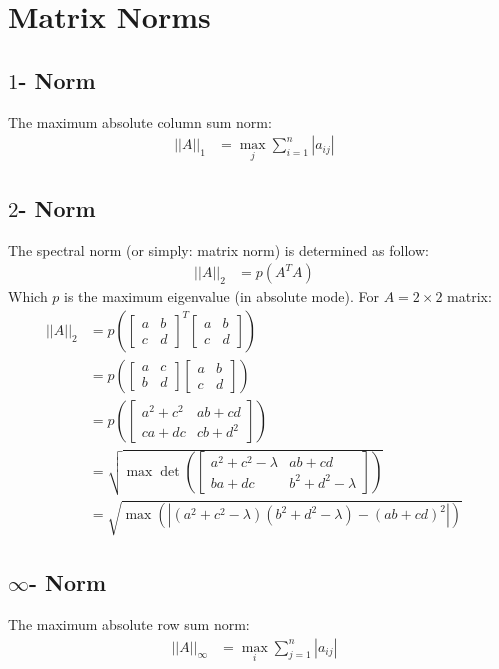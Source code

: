 \section{Matrix Norms}

	\subsection{$1$- Norm}

		The maximum absolute column sum norm:
		\begin{align}
			||A||_{1} &= \max_{j} \sum_{i=1}^{n}\left|a_{ij}\right|&
		\end{align}

	\subsection{$2$- Norm}
		The spectral norm (or simply: matrix norm) is determined as follow:
		\begin{align}
			||A||_{2} &= p\left(A^{T}A\right)&
		\end{align}
		Which $p$ is the maximum eigenvalue (in absolute mode). For $A = 2 \times 2$ matrix:
		\begin{align}
			||A||_{2} &= p\left(
				\begin{bmatrix}
					a & b \\
					c & d
				\end{bmatrix}^{T}
				\begin{bmatrix}
					a & b \\
					c & d
				\end{bmatrix}\right)&
			\\ &=
			p\left(
				\begin{bmatrix}
					a & c \\
					b & d
				\end{bmatrix}
				\begin{bmatrix}
					a & b \\
					c & d
				\end{bmatrix}\right)&
			\\ &=
			p\left(
				\begin{bmatrix}
					a^{2} + c^{2} & ab + cd \\
					ca + dc & cb + d^{2}
				\end{bmatrix}\right)&
			\\ &=
			\sqrt{\max \det \left(
				\begin{bmatrix}
					a^{2} + c^{2} - \lambda & ab + cd \\
					ba + dc & b^{2} + d^{2} - \lambda
				\end{bmatrix}\right)}&
			\\ &=
			\sqrt{\max \left(|(a^{2} + c^{2} - \lambda)(b^{2} + d^{2} - \lambda) - (ab + cd)^{2}|\right)}&
		\end{align}

	\subsection{$\infty$- Norm}

		The maximum absolute row sum norm:
		\begin{align}
			||A||_{\infty} &= \max_{i} \sum_{j=1}^{n}\left|a_{ij}\right|&
		\end{align}
